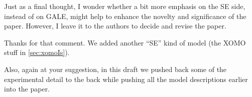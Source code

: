 \documentclass[10pt,journal,compsoc]{IEEEtran}
\newcommand{\tion}[1]{\textsection\ref{sec:#1}}
\newenvironment{changed}{\par}{\par}
\begin{document}
Just as a final thought, I wonder whether a bit more emphasis on the SE side, instead of on GALE, might help to enhance the novelty and significance of the paper. However, I leave it to the authors to decide and revise the paper.

\begin{changed}
Thanks for that comment. We added another ``SE'' kind of model (the XOMO stuff in \tion{xomoIs}).

Also, again at your suggestion, in this draft
we pushed back some of the experimental detail to the back while
pushing all the model descriptions earlier into the paper.
\end{changed}
\end{document}
